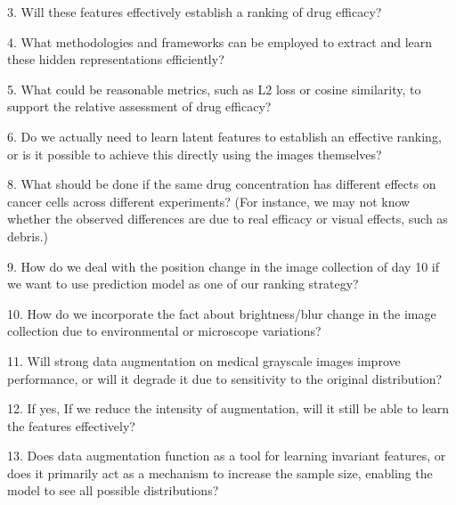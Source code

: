 3. Will these features effectively establish a ranking of drug efficacy?

4. What methodologies and frameworks can be employed to extract and learn these hidden representations efficiently?

5. What could be reasonable metrics, such as L2 loss or cosine similarity, to support the relative assessment of drug efficacy?

6. Do we actually need to learn latent features to establish an effective ranking, or is it possible to achieve this directly using the images themselves?

8. What should be done if the same drug concentration has different effects on cancer cells across different experiments? (For instance, 
we may not know whether the observed differences are due to real efficacy or visual effects, such as debris.)


9. How do we deal with the position change in the image collection of day 10 if we want to use prediction 
model as one of our ranking strategy?

10. How do we incorporate the fact about brightness/blur change in the image collection due to environmental or microscope 
variations?

11. Will strong data augmentation on medical grayscale images improve performance, or will it degrade it due to sensitivity to the original distribution?

12. If yes, If we reduce the intensity of augmentation, will it still be able to learn the features effectively?


13. Does data augmentation function as a tool for learning invariant features, or does it primarily act as a mechanism to increase the sample size,
 enabling the model to see all possible distributions?



